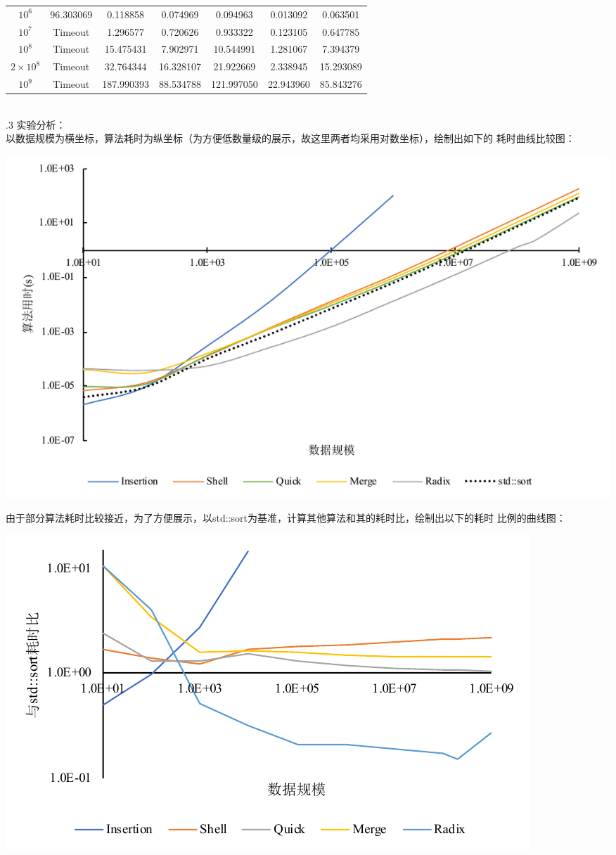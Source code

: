 \documentclass[a4paper]{article}
\begin{document}
\begin{enumerate}
{\begin{tabular}{c||cccccc}
    $10^6$        &96.303069  &0.118858   &0.074969   &0.094963   &0.013092   &0.063501 \\
    $10^7$        &Timeout    &1.296577   &0.720626   &0.933322   &0.123105   &0.647785 \\
    $10^8$        &Timeout    &15.475431  &7.902971   &10.544991  &1.281067   &7.394379 \\
    $2\times10^8$ &Timeout    &32.764344  &16.328107  &21.922669  &2.338945   &15.293089 \\
    $10^9$        &Timeout    &187.990393 &88.534788  &121.997050 &22.943960  &85.843276 \\
    \hline\hline
  \end{tabular}
  }\\
  .3 实验分析：\\
  以数据规模为横坐标，算法耗时为纵坐标（为方便低数量级的展示，故这里两者均采用对数坐标），绘制出如下的
  耗时曲线比较图：
  \begin{center}
    \includegraphics[scale=0.56]{Pictures/SR.pdf}
  \end{center}
  由于部分算法耗时比较接近，为了方便展示，以std::sort为基准，计算其他算法和其的耗时比，绘制出以下的耗时
  比例的曲线图：
  \begin{center}
    \includegraphics[scale=0.8]{Pictures/SRR.pdf}

\end{center}
\end{enumerate}
\end{document}
